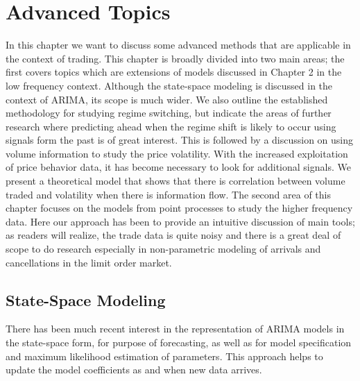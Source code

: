 
\chapter{Advanced Topics}


In this chapter we want to discuss some advanced methods that are applicable in the context of trading. This chapter is broadly divided into two main areas; the first covers topics which are extensions of models discussed in Chapter 2 in the low frequency context. Although the state-space modeling is discussed in the context of ARIMA, its scope is much wider. We also outline the established methodology for studying regime switching, but indicate the areas of further research where predicting ahead when the regime shift is likely to occur using signals form the past is of great interest. This is followed by a discussion on using volume information to study the price volatility. With the increased exploitation of price behavior data, it has become necessary to look for additional signals. We present a theoretical model that shows that there is correlation between volume traded and volatility when there is information flow. The second area of this chapter focuses on the models from point processes to study the higher frequency data. Here our approach has been to provide an intuitive discussion of main tools; as readers will realize, the trade data is quite noisy and there is a great deal of scope to do research especially in non-parametric modeling of arrivals and cancellations in the limit order market. 


\section{State-Space Modeling} 


There has been much recent interest in the representation of ARIMA models in the state-space form, for purpose of forecasting, as well as for model specification and maximum likelihood estimation of parameters. This approach helps to update the model coefficients as and when new data arrives. 


